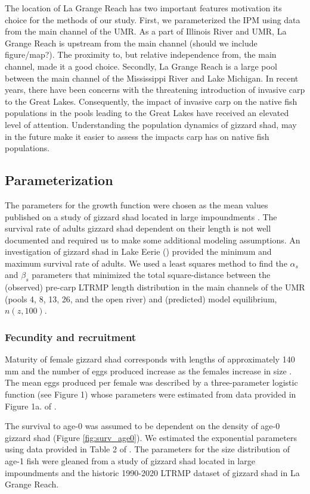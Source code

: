 \documentclass[preprint,review,12pt,authoryear]{elsarticle}
\begin{document}
The location of La Grange Reach has two important features motivation its choice for the methods of our study. 
First, we parameterized the IPM using data from the main channel of the UMR.  As a part of Illinois River and UMR, La Grange Reach is upstream from the main channel (should we include figure/map?).  
The proximity to, but relative independence from, the main channel, made it a good choice.  Secondly, La Grange Reach is a large pool between the main channel of the Mississippi River and Lake Michigan.  
In recent years, there have been concerns with the threatening introduction of invasive carp to the Great Lakes.  
Consequently, the impact of invasive carp on the native fish populations in the pools leading to the Great Lakes have received an elevated level of attention.  
Understanding the population dynamics of gizzard shad, may in the future make it easier to assess the impacts carp has on native fish populations.

\subsection{Parameterization}
The parameters for the growth function were chosen as the mean values published on a study of gizzard shad located in large impoundments \citep{michaletz2017variation}. 
The survival rate of adults gizzard shad dependent on their length is not well documented and required us to make some additional modeling assumptions.  
An investigation of gizzard shad in Lake Eerie (\cite{bodola1955life}) provided the minimum and maximum survival rate of adults. 
We used a least squares method to find the $\alpha_s$ and $\beta_s$ parameters that 
minimized the total square-distance between the (observed) pre-carp LTRMP length distribution in the main channels of the UMR (pools 4, 8, 13, 26, and the open river) and (predicted) model equilibrium, $n(z,100)$.  

\subsubsection{Fecundity and recruitment}
Maturity of female gizzard shad corresponds with lengths of approximately 140 mm and the number of eggs produced increase as the females increase in size \citep{jons1997ovarian}.  
The mean eggs produced per female was described by a three-parameter logistic function (see Figure 1) whose parameters were estimated from data provided in Figure 1a. of \citep{jons1997ovarian}. 

The survival to age-0 was assumed to be dependent on the density of age-0 gizzard shad (Figure \ref{fig:surv_age0}).  
We estimated the exponential parameters using data provided in Table 2 of \citep{michaletz2010overwinter}. 
The parameters for the size distribution of age-1 fish were gleaned from a study of gizzard shad located in large impoundments \citep{michaletz2017variation} and the historic 1990-2020 LTRMP dataset of gizzard shad in La Grange Reach.
\end{document}
